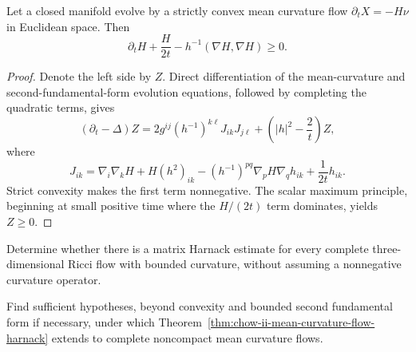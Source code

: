 \begin{theorem}
\label{thm:chow-ii-mean-curvature-flow-harnack}

Let a closed manifold evolve by a strictly convex mean curvature flow
\(\partial_tX=-H\nu\) in Euclidean space.  Then
\[
\partial_tH+\frac{H}{2t}-h^{-1}(\nabla H,\nabla H)\ge0.
\]
\end{theorem}
\begin{proof}
\sketch Denote the left side by \(Z\).  Direct differentiation of the mean-curvature
and second-fundamental-form evolution equations, followed by completing the
quadratic terms, gives
\[
(\partial_t-\Delta)Z
=2g^{ij}(h^{-1})^{k\ell}J_{ik}J_{j\ell}
+\left(|h|^2-\frac2t\right)Z,
\]
where
\[
J_{ik}=\nabla_i\nabla_kH+H(h^2)_{ik}
-(h^{-1})^{pq}\nabla_pH\nabla_qh_{ik}+\frac1{2t}h_{ik}.
\]
Strict convexity makes the first term nonnegative.  The scalar maximum
principle, beginning at small positive time where the \(H/(2t)\) term
dominates, yields \(Z\ge0\).
\end{proof}

\begin{example}
\label{ex:chow-ii-arbitrary-three-dimensional-matrix-harnack-problem}
Determine whether there is a matrix Harnack estimate for every complete
three-dimensional Ricci flow with bounded curvature, without assuming a
nonnegative curvature operator.
\end{example}

\begin{example}
\label{ex:chow-ii-complete-noncompact-mcf-harnack-problem}
Find sufficient hypotheses, beyond convexity and bounded second fundamental
form if necessary, under which
Theorem~\ref{thm:chow-ii-mean-curvature-flow-harnack} extends to complete
noncompact mean curvature flows.
\end{example}
